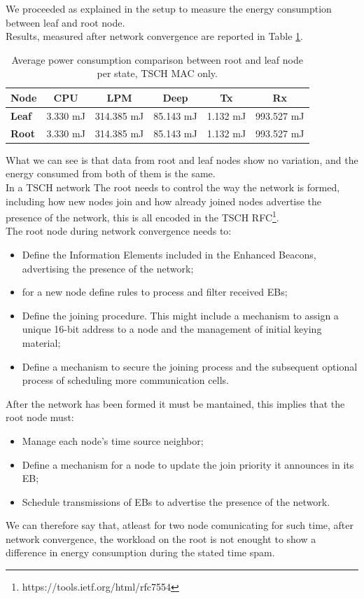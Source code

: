 \documentclass[conference]{IEEEtran}
\begin{document}
We proceeded as explained in the setup to measure the energy consumption between leaf and root node.\\
Results, measured after network convergence are reported in Table \ref{tab:MACOnly}.
\begin{table}[h]
	\centering
	\begin{tabular}{llllll}
		\hline
		\textbf{Node} & \multicolumn{1}{c}{\textbf{CPU}} & \multicolumn{1}{c}{\textbf{LPM}} & \multicolumn{1}{c}{\textbf{Deep}} & \multicolumn{1}{c}{\textbf{Tx}} & \multicolumn{1}{c}{\textbf{Rx}} \\ \hline
		\textbf{Leaf} & 3.330 mJ                         & 314.385 mJ                       & 85.143 mJ                         & 1.132 mJ                        & 993.527 mJ                      \\
		\textbf{Root} & 3.330 mJ                         & 314.385 mJ                       & 85.143 mJ                         & 1.132 mJ                        & 993.527 mJ                      \\ \hline
	\end{tabular}
	\caption{Average power consumption comparison between root and leaf node per state, TSCH MAC only.}
	\label{tab:MACOnly}
\end{table}
What we can see is that data from root and leaf nodes show no variation, and the energy consumed from both of them is the same.\\
In a TSCH network The root needs to control the way the network is formed, including how new nodes join and how already joined nodes advertise the presence of the network, this is all encoded in the TSCH RFC\footnote{https://tools.ietf.org/html/rfc7554}.\\
The root node during network convergence needs to:
\begin{itemize}
	\item Define the Information Elements included in the Enhanced Beacons, advertising the presence of the network;
	\item for a new node define rules to process and filter received EBs;
	\item Define the joining procedure.  This might include a mechanism to assign a unique 16-bit address to a node and the management of initial keying material;
	\item Define a mechanism to secure the joining process and the subsequent optional process of scheduling more communication cells.
\end{itemize}
After the network has been formed it must be mantained, this implies that the root node must:
\begin{itemize}
	\item Manage each node's time source neighbor;
	\item Define a mechanism for a node to update the join priority it announces in its EB;
	\item Schedule transmissions of EBs to advertise the presence of the network.
\end{itemize}
We can therefore say that, atleast for two node comunicating for such time, after network convergence, the workload on the root is not enought to show a difference in energy consumption during the stated time spam.
\end{document}
